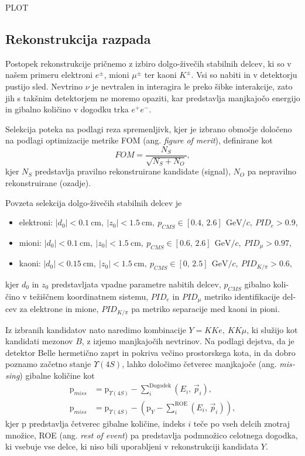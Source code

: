 \documentclass[headings=standardclasses,headings=big,oneside,a4paper,openany,12pt]{scrbook}
\newcommand {\e}[1]{\mathrm{~#1}}
\begin{document}
\begin{otherlanguage}{slovene}
PLOT

\subsection{Rekonstrukcija razpada}

Postopek rekonstrukcije pričnemo z izbiro dolgo-živečih stabilnih delcev, ki so v našem primeru elektroni $e^\pm$, mioni $\mu^\pm$ ter kaoni $K^\pm$. Vsi so nabiti in v detektorju pustijo sled. Nevtrino $\nu$ je nevtralen in interagira le preko šibke interakcije, zato jih s takšnim detektorjem ne moremo opaziti, kar predstavlja manjkajočo energijo in gibalno količino v dogodku trka $e^+e^-$.

Selekcija poteka na podlagi reza spremenljivk, kjer je izbrano območje določeno na podlagi optimizacije metrike FOM (ang. \textit{figure of merit}), definirane kot 
\begin{equation}
FOM = \frac{N_S}{\sqrt{N_S + N_O}},
\end{equation}
kjer $N_S$ predstavlja pravilno rekonstruirane kandidate (signal), $N_O$ pa nepravilno rekonstruirane (ozadje).

Povzeta selekcija dolgo-živečih stabilnih delcev je
\begin{itemize}
\item elektroni: $\vert d_0 \vert < 0.1\e{cm},~\vert z_0 \vert < 1.5\e{cm},~p_{CMS} \in [0.4,\,2.6]~\e{GeV}/c,~PID_e > 0.9$,
\item mioni: $\vert d_0 \vert < 0.1\e{cm},~\vert z_0 \vert < 1.5\e{cm},~p_{CMS} \in [0.6,\,2.6]~\e{GeV}/c,~PID_\mu > 0.97$,
\item kaoni: $\vert d_0 \vert < 0.15\e{cm},~\vert z_0 \vert < 1.5\e{cm},~p_{CMS} \in [0,\,2.5]~\e{GeV}/c,~PID_{K/\pi} > 0.6$,
\end{itemize}
kjer $d_0$ in $z_0$ predstavljata vpadne parametre nabitih delcev, $p_{CMS}$ gibalno količino v težiščnem koordinatnem sistemu, $PID_e$ in $PID_\mu$ metriko identifikacije delcev za elektrone in mione, $PID_{K/\pi}$ pa metriko separacije med kaoni in pioni.

Iz izbranih kandidatov nato naredimo kombinacije $Y = KKe,~KK\mu$, ki služijo kot kandidati mezonov $B$, z izjemo manjkajočih nevtrinov. Na podlagi dejstva, da je detektor Belle hermetično zaprt in pokriva večino prostorskega kota, in da dobro poznamo začetno stanje $\Upsilon(4S)$, lahko določimo četverec manjkajoče (ang. \textit{missing}) gibalne količine kot
\begin{align}
\mathrm{p}_{miss} &= \mathrm{p}_{\Upsilon(4S)} - \sum_i^{\mathrm{Dogodek}}\left(E_i,\,\vec{p}_i \right),\\
\label{eq:ROEloop_si}
\mathrm{p}_{miss} &= \mathrm{p}_{\Upsilon(4S)} - \left(\mathrm{p}_{Y} -\sum_i^{\mathrm{ROE}}\left(E_i,\,\vec{p}_i \right)\right),
\end{align}
kjer $\mathrm{p}$ predstavlja četverec gibalne količine, indeks $i$ teče po vseh delcih znotraj množice, ROE (ang. \textit{rest of event}) pa predstavlja podmnožico celotnega dogodka, ki vsebuje vse delce, ki niso bili uporabljeni v rekonstrukciji kandidata $Y$.


\end{otherlanguage}
\end{document}
